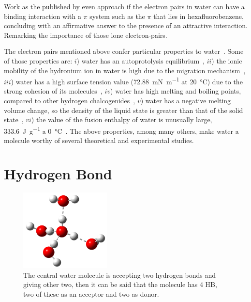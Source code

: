 Work as the published by \citet{Gallivan1999} even approach if the electron
pairs in water can have a binding interaction with a $\pi$ system such as the
$\pi$ that lies in hexafluorobenzene, concluding with an affirmative answer to
the presence of an attractive interaction. Remarking the importance of those
lone electron-pairs.

The electron pairs mentioned above confer particular properties to
water~\cite{biology}. Some of those properties are:
$i$) water has an autoprotolysis equilibrium~\cite{mcmurry},
$ii$) the ionic mobility of the hydronium ion in water is high due to the
migration mechanism~\cite{voet},
$iii$) water has a high surface tension value (\SI{72.88}{\milli \newton \per
\meter} at \SI{20}{\celsius}) due to the strong cohesion of its
molecules~\cite{dean92:LHC},
$iv$) water has high melting and boiling points, compared to other hydrogen
chalcogenides~\cite{morrison},
$v$) water has a negative melting volume change, so the density of the liquid
state is greater than that of the solid state~\cite{serway2001fisica},
$vi$) the value of the fusion enthalpy of water is unusually large,
\SI{333.6}{\joule \per \gram} a
\SI{0}{\celsius}~\cite{noauthororeditor2007handbook}.  The above properties,
among many others, make water a molecule worthy of several theoretical and
experimental studies.


\newpage

\section{Hydrogen Bond}

\begin{figure} %
    \centering
    \includegraphics[width=0.41\textwidth]{2/img/4h2o}
    \caption{The central water molecule is accepting two hydrogen
    bonds and giving other two,
    then it can be said that the molecule has 4 HB, two of these
    as an acceptor and two as donor.}
    \label{4_h2o}
\end{figure}

